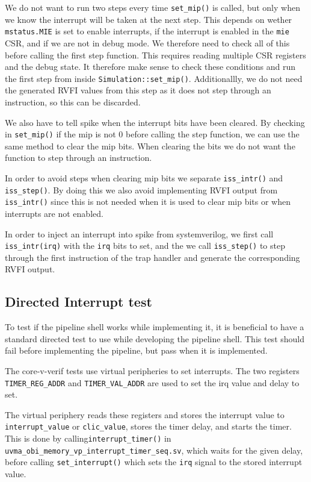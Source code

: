 We do not want to run two steps every time \lstinline{set_mip()} is called, but only when we know the interrupt will be taken at the next step. This depends on wether \lstinline{mstatus.MIE} is set to enable interrupts, if the interrupt is enabled in the \lstinline{mie} CSR, and if we are not in debug mode. We therefore need to check all of this before calling the first step function. This requires reading multiple CSR registers and the debug state. It therefore make sense to check these conditions and run the first step from inside \lstinline{Simulation::set_mip()}. Additionallly, we do not need the generated RVFI values from this step as it does not step through an instruction, so this can be discarded.

We also have to tell spike when the interrupt bits have been cleared. By checking in \lstinline{set_mip()} if the mip is not 0 before calling the step function, we can use the same method to clear the mip bits. When clearing the bits we do not want the function to step through an instruction.

In order to avoid steps when clearing mip bits we separate \lstinline{iss_intr()} and \lstinline{iss_step()}. By doing this we also avoid implementing RVFI output from \lstinline{iss_intr()} since this is not needed when it is used to clear mip bits or when interrupts are not enabled. 

In order to inject an interrupt into spike from systemverilog, we first call \lstinline{iss_intr(irq)} with the \lstinline{irq} bits to set, and the we call \lstinline{iss_step()} to step through the first instruction of the trap handler and generate the corresponding RVFI output.


\subsection{Directed Interrupt test}

To test if the pipeline shell works while implementing it, it is beneficial to have a standard directed test to use while developing the pipeline shell.
This test should fail before implementing the pipeline, but pass when it is implemented.

The core-v-verif tests use virtual peripheries to set interrupts. 
The two registers \lstinline{TIMER_REG_ADDR} and \lstinline{TIMER_VAL_ADDR} are used to set the irq value and delay to set.  

The virtual periphery reads these registers and stores the interrupt value to \lstinline{interrupt_value} or \lstinline{clic_value}, stores the timer delay, and starts the timer. This is done by calling\lstinline{interrupt_timer()} in \lstinline{uvma_obi_memory_vp_interrupt_timer_seq.sv}, which waits for the given delay, before calling \lstinline{set_interrupt()} which sets the \lstinline{irq} signal to the stored interrupt value. 

